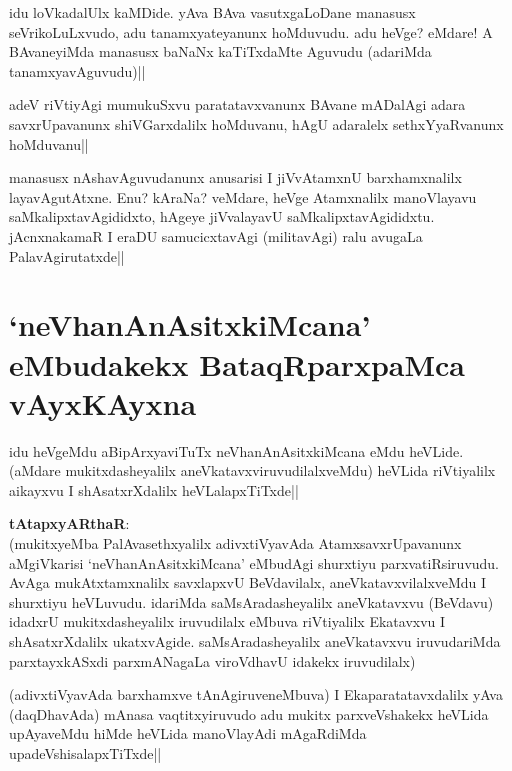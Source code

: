 \begin{artha} 
idu loVkadalUlx kaMDide. yAva BAva vasutxgaLoDane manasusx 
seVrikoLuLxvudo, adu tanamxyateyanunx hoMduvudu. adu heVge? eMdare! A 
BAvaneyiMda manasusx baNaNx kaTiTxdaMte Aguvudu (adariMda 
tanamxyavAguvudu)||
\end{artha}

\begin{artha} 
adeV riVtiyAgi mumukuSxvu paratatavxvanunx BAvane mADalAgi adara 
savxrUpavanunx shiVGarxdalilx hoMduvanu, hAgU adaralelx 
sethxYyaRvanunx hoMduvanu||
\end{artha}

\begin{artha} 
manasusx nAshavAguvudanunx anusarisi I jiVvAtamxnU barxhamxnalilx 
layavAgutAtxne. Enu? kAraNa? veMdare, heVge Atamxnalilx manoVlayavu 
saMkalipxtavAgididxto, hAgeye jiVvalayavU saMkalipxtavAgididxtu. 
jAcnxnakamaR I eraDU samucicxtavAgi (militavAgi) ralu avugaLa 
PalavAgirutatxde|| 
\end{artha}

\section*{`neVhanAnAsitxkiMcana' eMbudakekx BataqRparxpaMca vAyxKAyxna}


\begin{artha} 
idu heVgeMdu aBipArxyaviTuTx neVhanAnAsitxkiMcana eMdu heVLide. 
(aMdare mukitxdasheyalilx aneVkatavxviruvudilalxveMdu) heVLida 
riVtiyalilx aikayxvu I shAsatxrXdalilx heVLalapxTiTxde||
\end{artha}


\textbf{tAtapxyARthaR}:\\
(mukitxyeMba PalAvasethxyalilx adivxtiVyavAda 
AtamxsavxrUpavanunx 
aMgiVkarisi `neVhanAnAsitxkiMcana' eMbudAgi shurxtiyu 
parxvatiRsiruvudu. AvAga mukAtxtamxnalilx savxlapxvU BeVdavilalx, 
aneVkatavxvilalxveMdu I shurxtiyu heVLuvudu. idariMda 
saMsAradasheyalilx aneVkatavxvu (BeVdavu) idadxrU mukitxdasheyalilx 
iruvudilalx eMbuva riVtiyalilx Ekatavxvu I shAsatxrXdalilx 
ukatxvAgide. saMsAradasheyalilx aneVkatavxvu iruvudariMda 
parxtayxkASxdi parxmANagaLa viroVdhavU idakekx iruvudilalx)



\begin{artha} 
(adivxtiVyavAda barxhamxve tAnAgiruveneMbuva) I Ekaparatatavxdalilx 
yAva (daqDhavAda) mAnasa vaqtitxyiruvudo adu mukitx parxveVshakekx 
heVLida upAyaveMdu hiMde heVLida manoVlayAdi mAgaRdiMda 
upadeVshisalapxTiTxde||
\end{artha}

